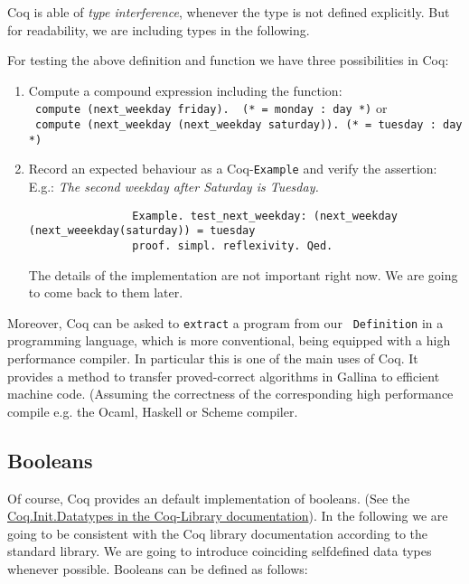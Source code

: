   Coq is able of {\itshape type  interference}, whenever the type is not defined explicitly.
  But for readability, we are including types in the following.
   
  For testing the above definition and function we have three possibilities in Coq:
     
   \begin{enumerate}
   \item Compute a compound expression including the function:\\
 		 \lstinline! compute (next_weekday friday).  (* = monday : day *)! or \\
   		 \lstinline! compute (next_weekday (next_weekday saturday)). (* = tuesday : day *)!
   \item Record an expected behaviour as a Coq-\lstinline!Example! and verify the assertion: 
         E.g.: {\itshape The second weekday after Saturday is Tuesday.}  
   
		   \begin{lstlisting}
		   		Example. test_next_weekday: (next_weekday (next_weeekday(saturday)) = tuesday 
		   		proof. simpl. reflexivity. Qed.
		   \end{lstlisting}
   			The details of the implementation are not important right now. We are going to come back to them later.
   \end{enumerate}   

    Moreover, Coq can be asked to \lstinline!extract! a program from our \lstinline! Definition! in a programming language, which is more conventional, being equipped with a high performance compiler.
    In particular this is one of the main uses of Coq. 
    It provides a method to transfer proved-correct algorithms in Gallina to efficient machine code.
    (Assuming the correctness of the corresponding high performance compile e.g. the Ocaml, Haskell or Scheme compiler. 


\subsection{Booleans}

    Of course, Coq provides an default implementation of booleans.
    (See the \href{https://www.cs.princeton.edu/courses/archive/fall07/cos595/stdlib/html/Coq.Init.Datatypes.html}{Coq.Init.Datatypes in the Coq-Library documentation}).  
    In the following we are going to be consistent with the Coq library documentation according to the standard library.
    We are going to introduce coinciding selfdefined data types whenever possible.
    Booleans can be defined as follows:
    
